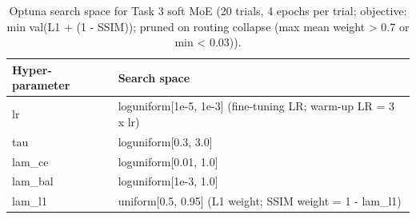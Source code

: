\begin{table}[t]
\centering
\caption{Optuna search space for Task 3 soft MoE (20 trials, 4 epochs per trial; objective: min val(L1 + (1 - SSIM)); pruned on routing collapse (max mean weight > 0.7 or min < 0.03)).}
\label{tab:space_task3_moe}
\footnotesize
\begin{tabular}{lp{5.6cm}}
\toprule
Hyper-parameter & Search space \\
\midrule
lr & loguniform[1e-5, 1e-3]  (fine-tuning LR; warm-up LR = 3 x lr) \\
tau & loguniform[0.3, 3.0] \\
lam\_ce & loguniform[0.01, 1.0] \\
lam\_bal & loguniform[1e-3, 1.0] \\
lam\_l1 & uniform[0.5, 0.95]  (L1 weight; SSIM weight = 1 - lam\_l1) \\
\bottomrule
\end{tabular}
\end{table}

